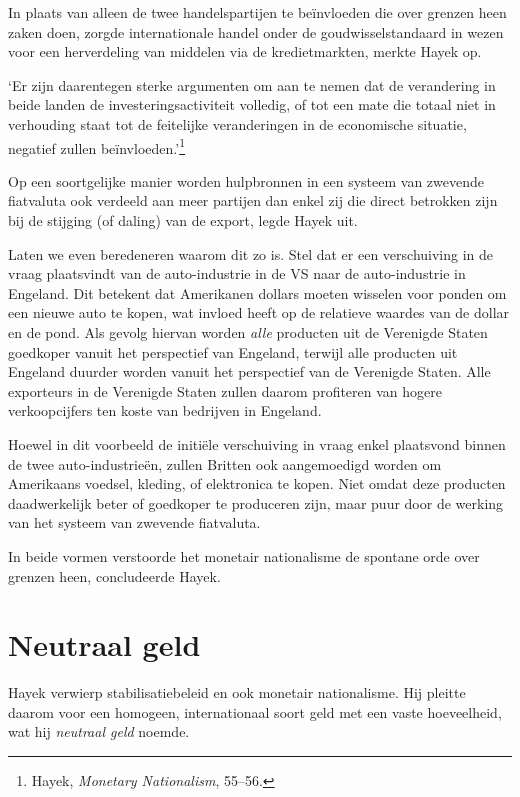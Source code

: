 \documentclass[
  a5paper,
  smalldemyvopaper,11pt,twoside,onecolumn,openright,extrafontsizes,
hidelinks]{memoir}
\renewenvironment{quote}%
               {\list{}{\rightmargin=.3cm\leftmargin=.3cm}%
                \itshape \item[]}%
               {\endlist}
\begin{document}
In plaats van alleen de twee handelspartijen te beïnvloeden die over
grenzen heen zaken doen, zorgde internationale handel onder de
goudwisselstandaard in wezen voor een herverdeling van middelen via de
kredietmarkten, merkte Hayek op.

\begin{quote}
`Er zijn daarentegen sterke argumenten om aan te nemen dat de
verandering in beide landen de investeringsactiviteit volledig, of tot
een mate die totaal niet in verhouding staat tot de feitelijke
veranderingen in de economische situatie, negatief zullen
beïnvloeden.'\footnote{\hspace{0pt}Hayek, \emph{Monetary Nationalism},
  55--56.}
\end{quote}

Op een soortgelijke manier worden hulpbronnen in een systeem van
zwevende fiatvaluta ook verdeeld aan meer partijen dan enkel zij die
direct betrokken zijn bij de stijging (of daling) van de export, legde
Hayek uit.

Laten we even beredeneren waarom dit zo is. Stel dat er een verschuiving
in de vraag plaatsvindt van de auto-industrie in de VS naar de
auto-industrie in Engeland. Dit betekent dat Amerikanen dollars moeten
wisselen voor ponden om een nieuwe auto te kopen, wat invloed heeft op
de relatieve waardes van de dollar en de pond. Als gevolg hiervan worden
\emph{alle} producten uit de Verenigde Staten goedkoper vanuit het
perspectief van Engeland, terwijl alle producten uit Engeland duurder
worden vanuit het perspectief van de Verenigde Staten. Alle exporteurs
in de Verenigde Staten zullen daarom profiteren van hogere
verkoopcijfers ten koste van bedrijven in Engeland.

Hoewel in dit voorbeeld de initiële verschuiving in vraag enkel
plaatsvond binnen de twee auto-industrieën, zullen Britten ook
aangemoedigd worden om Amerikaans voedsel, kleding, of elektronica te
kopen. Niet omdat deze producten daadwerkelijk beter of goedkoper te
produceren zijn, maar puur door de werking van het systeem van zwevende
fiatvaluta.

In beide vormen verstoorde het monetair nationalisme de spontane orde
over grenzen heen, concludeerde Hayek.

\section{Neutraal geld}\label{neutraal-geld-1}

Hayek verwierp stabilisatiebeleid en ook monetair nationalisme. Hij
pleitte daarom voor een homogeen, internationaal soort geld met een
vaste hoeveelheid, wat hij \emph{neutraal geld} noemde.
\end{document}

